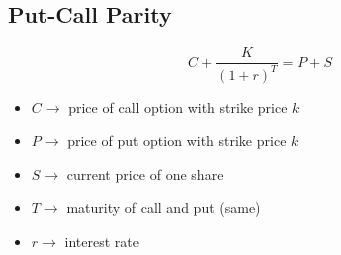 \documentclass[11pt]{article}
\begin{document}
\subsection{Put-Call Parity}
$$ C + \frac{K}{(1+r)^T} = P +S $$ 
\begin{itemize}
\item $ C \rightarrow$ price of call option with strike price $k$
\item $ P \rightarrow$ price of put option with strike price $k$
\item $ S \rightarrow$ current price of one share
\item $ T \rightarrow$ maturity of call and put (same)
\item $ r \rightarrow$ interest rate
\end{itemize}

\pagebreak
\end{document}
